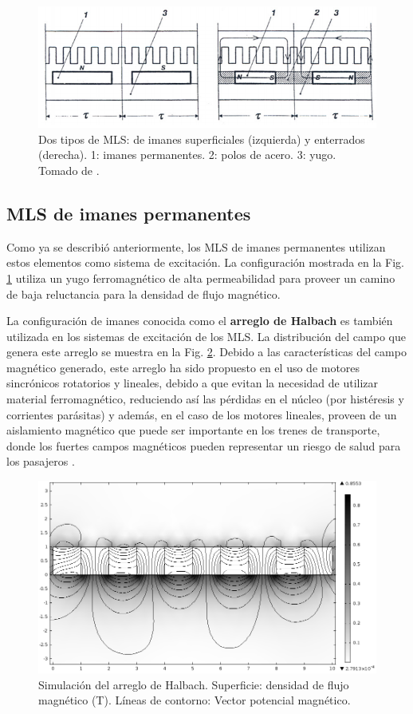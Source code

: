 \begin{figure}[hbtp]
\centering
\includegraphics[scale=0.7]{../img/lsm1.PNG}
\caption{Dos tipos de MLS: de imanes superficiales (izquierda) y enterrados (derecha). 1: imanes permanentes. 2: polos de acero. 3: yugo. Tomado de \cite{gieras2000}.}
\label{lsm1}
\end{figure}

\subsection{MLS de imanes permanentes}
Como ya se describió anteriormente, los MLS de imanes permanentes utilizan estos elementos como sistema de excitación. La configuración mostrada en la Fig. \ref{lsm1} utiliza un yugo ferromagnético de alta permeabilidad para proveer un camino de baja reluctancia para la densidad de flujo magnético.

La configuración de imanes conocida como el  \textbf{arreglo de Halbach} \cite{mallison1973} es también utilizada en los sistemas de excitación de los MLS. La distribución del campo que genera este arreglo se muestra en la Fig. \ref{halbachsimulation}. Debido a las características del campo magnético generado, este arreglo ha sido propuesto en el uso de motores sincrónicos rotatorios y lineales, debido a que evitan la necesidad de utilizar material ferromagnético, reduciendo así las pérdidas en el núcleo (por histéresis y corrientes parásitas) y además, en el caso de los motores lineales, proveen de un aislamiento magnético que puede ser importante en los trenes de transporte, donde los fuertes campos magnéticos pueden representar un riesgo de salud para los pasajeros \cite{trumper1993,trumper1994}.

\begin{figure}[h]
\centering
\includegraphics[scale=0.4]{../img/halbachsimulation.PNG}
\caption{Simulación del arreglo de Halbach. Superficie: densidad de flujo magnético (T). Líneas de contorno: Vector potencial magnético.}
\label{halbachsimulation}
\end{figure}


